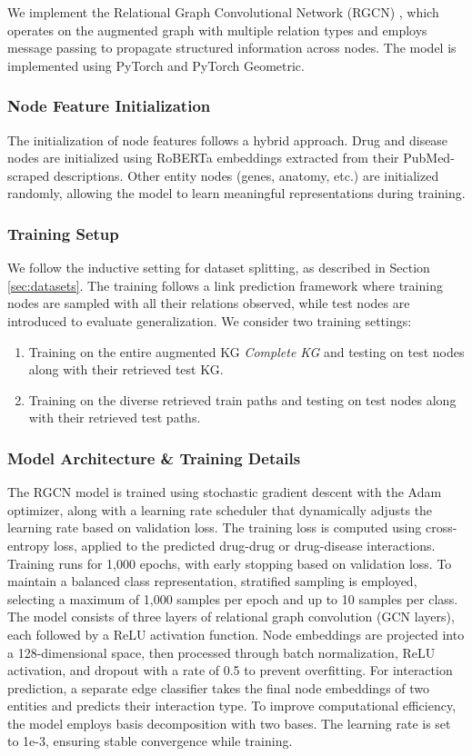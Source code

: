 We implement the Relational Graph Convolutional Network (RGCN) \cite{Schlichtkrull2017ModelingRD}, which operates on the augmented graph with multiple relation types and employs message passing to propagate structured information across nodes. The model is implemented using PyTorch and PyTorch Geometric.

\subsubsection{Node Feature Initialization}
The initialization of node features follows a hybrid approach.
Drug and disease nodes are initialized using RoBERTa \cite{liu2019robertarobustlyoptimizedbert} embeddings extracted from their PubMed-scraped descriptions.
Other entity nodes (genes, anatomy, etc.) are initialized randomly, allowing the model to learn meaningful representations during training.

\subsubsection{Training Setup}
We follow the inductive setting for dataset splitting, as described in Section \ref{sec:datasets}. 
The training follows a link prediction framework where training nodes are sampled with all their relations observed, while test nodes are introduced to evaluate generalization. We consider two training settings:
\begin{enumerate}
    \item Training on the entire augmented KG \textit{Complete KG} and testing on test nodes along with their retrieved test KG.
    \item Training on the diverse retrieved train paths and testing on test nodes along with their retrieved test paths.
\end{enumerate}

\subsubsection{Model Architecture \& Training Details}

The RGCN model is trained using stochastic gradient descent with the Adam optimizer, along with a learning rate scheduler that dynamically adjusts the learning rate based on validation loss. The training loss is computed using cross-entropy loss, applied to the predicted drug-drug or drug-disease interactions. Training runs for 1,000 epochs, with early stopping based on validation loss. To maintain a balanced class representation, stratified sampling is employed, selecting a maximum of 1,000 samples per epoch and up to 10 samples per class. The model consists of three layers of relational graph convolution (GCN layers), each followed by a ReLU activation function. Node embeddings are projected into a 128-dimensional space, then processed through batch normalization, ReLU activation, and dropout with a rate of 0.5 to prevent overfitting. For interaction prediction, a separate edge classifier takes the final node embeddings of two entities and predicts their interaction type. To improve computational efficiency, the model employs basis decomposition with two bases. The learning rate is set to 1e-3, ensuring stable convergence while training.


